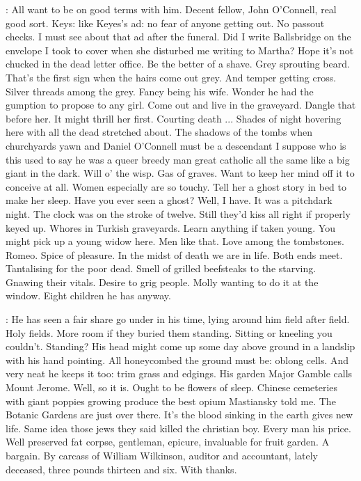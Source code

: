\BloomInt:
All want to be on good terms with him.
Decent fellow, John O'Connell, real good sort.
Keys:
like Keyes's ad:
no fear of anyone getting out.
No passout checks.
I must see about that ad after the funeral.
Did I write Ballsbridge on the envelope I took to cover
when she disturbed me writing to Martha?
Hope it's not chucked in the dead letter office.
Be the better of a shave.
Grey sprouting beard.
That's the first sign when the hairs come out grey.
And temper getting cross.
Silver threads among the grey.
Fancy being his wife.
Wonder he had the gumption to propose to any girl.
Come out and live in the graveyard.
Dangle that before her.
It might thrill her first.
Courting death ...
Shades of night hovering here with all the dead stretched about.
The shadows of the tombs when churchyards yawn
and Daniel O'Connell
must be a descendant I suppose
who is this used to say
he was a queer breedy man
great catholic all the same
like a big giant in the dark.
Will o' the wisp.
Gas of graves.
Want to keep her mind off it to conceive at all.
Women especially are so touchy.
Tell her a ghost story in bed to make her sleep.
Have you ever seen a ghost?
Well, I have.
It was a pitchdark night.
The clock was on the stroke of twelve.
Still they'd kiss all right if properly keyed up.
Whores in Turkish graveyards.
Learn anything if taken young.
You might pick up a young widow here.
Men like that.
Love among the tombstones.
Romeo.
Spice of pleasure.
In the midst of death we are in life.
Both ends meet.
Tantalising for the poor dead.
Smell of grilled beefsteaks to the starving.
Gnawing their vitals.
Desire to grig people.
Molly wanting to do it at the window.
Eight children he has anyway.

\BloomInt:
He has seen a fair share go under in his time,
lying around him field after field.
Holy fields.
More room if they buried them standing.
Sitting or kneeling you couldn't.
Standing?
His head might come up some day above ground in a landslip with his hand pointing.
All honeycombed the ground must be:
oblong cells.
And very neat he keeps it too:
trim grass and edgings.
His garden Major Gamble calls Mount Jerome.
Well, so it is.
Ought to be flowers of sleep.
Chinese cemeteries with giant poppies growing produce the best opium
Mastiansky told me.
The Botanic Gardens are just over there.
It's the blood sinking in the earth gives new life.
Same idea those jews they said killed the christian boy.
Every man his price.
Well preserved fat corpse, gentleman, epicure,
invaluable for fruit garden.
A bargain.
By carcass of William Wilkinson,
auditor and accountant, lately deceased,
three pounds thirteen and six.
With thanks.

